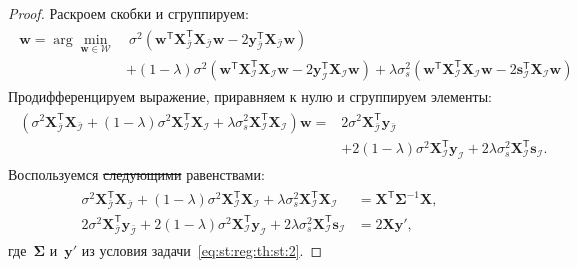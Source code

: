 \documentclass[12pt]{a&t}
\providecommand{\DIFdel}[1]{{\protect\color{red}\sout{#1}}}                      %
\providecommand{\DIFdelbegin}{} %
\providecommand{\DIFdelend}{} %
\newcommand{\DIFscaledelfig}{0.5}
\newlength{\DIFdelgraphicswidth} %
\newlength{\DIFdelgraphicsheight} %
\newcommand{\DIFdelincludegraphics}[2][]{%
\sbox{\DIFdelgraphicsbox}{\DIFOincludegraphics[#1]{#2}}%
\settoboxwidth{\DIFdelgraphicswidth}{\DIFdelgraphicsbox} %
\settoboxtotalheight{\DIFdelgraphicsheight}{\DIFdelgraphicsbox} %
\scalebox{\DIFscaledelfig}{%
\parbox[b]{\DIFdelgraphicswidth}{\usebox{\DIFdelgraphicsbox}\\[-\baselineskip] \rule{\DIFdelgraphicswidth}{0em}}\llap{\resizebox{\DIFdelgraphicswidth}{\DIFdelgraphicsheight}{%
\setlength{\unitlength}{\DIFdelgraphicswidth}%
\begin{picture}(1,1)%
\thicklines\linethickness{2pt} %
{\color[rgb]{1,0,0}\put(0,0){\framebox(1,1){}}}%
{\color[rgb]{1,0,0}\put(0,0){\line( 1,1){1}}}%
{\color[rgb]{1,0,0}\put(0,1){\line(1,-1){1}}}%
\end{picture}%
}\hspace*{3pt}}} %
} %
\DeclareRobustCommand{\DIFdelbegin}{\DIFOdelbegin \let\includegraphics\DIFdelincludegraphics} %
\DeclareRobustCommand{\DIFdelend}{\DIFOaddend \let\includegraphics\DIFOincludegraphics} %
\begin{document}
\begin{proof}
Раскроем скобки и сгруппируем:
\begin{gather}
\label{eq:st:reg:3}
\begin{aligned}
\hat{\mathbf{w}} = \arg\min_{\mathbf{w}\in \mathcal{W}} &~ \sigma^2\left(\mathbf{w}^{\mathsf{T}}\mathbf{X}^{\mathsf{T}}_{\bar{\mathcal{I}}}\mathbf{X}_{\bar{\mathcal{I}}}\mathbf{w} - 2\mathbf{y}^{\mathsf{T}}_{\bar{\mathcal{I}}}\mathbf{X}_{\bar{\mathcal{I}}}\mathbf{w}\right) \\
&+ \left(1-\lambda\right)\sigma^2\left(\mathbf{w}^{\mathsf{T}}\mathbf{X}^{\mathsf{T}}_{\mathcal{I}}\mathbf{X}_{\mathcal{I}}\mathbf{w}- 2\mathbf{y}^{\mathsf{T}}_{\mathcal{I}}\mathbf{X}_{\mathcal{I}}\mathbf{w}\right) + \lambda\sigma^2_s\left(\mathbf{w}^{\mathsf{T}}\mathbf{X}^{\mathsf{T}}_{\mathcal{I}}\mathbf{X}_{\mathcal{I}}\mathbf{w}- 2\mathbf{s}^{\mathsf{T}}_{\mathcal{I}}\mathbf{X}_{\mathcal{I}}\mathbf{w}\right)
\end{aligned}
\end{gather}
Продифференцируем выражение, приравняем к нулю и сгруппируем элементы:
\begin{gather}
\label{eq:st:reg:4}
\begin{aligned}
\left(\sigma^{2}\mathbf{X}^{\mathsf{T}}_{\bar{\mathcal{I}}}\mathbf{X}_{\bar{\mathcal{I}}} + \left(1-\lambda\right)\sigma^2\mathbf{X}^{\mathsf{T}}_{\mathcal{I}}\mathbf{X}_{\mathcal{I}} + \lambda\sigma^{2}_s\mathbf{X}^{\mathsf{T}}_{\mathcal{I}}\mathbf{X}_{\mathcal{I}}\right) \mathbf{w} =& 2\sigma^2\mathbf{X}^{\mathsf{T}}_{\bar{\mathcal{I}}}\mathbf{y}_{\bar{\mathcal{I}}} \\
&+ 2\left(1-\lambda\right)\sigma^2\mathbf{X}^{\mathsf{T}}_{\mathcal{I}}\mathbf{y}_{\mathcal{I}} + 2\lambda\sigma_s^2\mathbf{X}^{\mathsf{T}}_{\mathcal{I}}\mathbf{s}_{\mathcal{I}}.
\end{aligned}
\end{gather}
Воспользуемся \DIFdelbegin \DIFdel{следующими }\DIFdelend равенствами:
\begin{gather}
\label{eq:st:reg:simp}
\begin{aligned}
\sigma^{2}\mathbf{X}^{\mathsf{T}}_{\bar{\mathcal{I}}}\mathbf{X}_{\bar{\mathcal{I}}} + \left(1-\lambda\right)\sigma^2\mathbf{X}^{\mathsf{T}}_{\mathcal{I}}\mathbf{X}_{\mathcal{I}} + \lambda\sigma^{2}_s\mathbf{X}^{\mathsf{T}}_{\mathcal{I}}\mathbf{X}_{\mathcal{I}} &= \mathbf{X}^{\mathsf{T}}\bm{\Sigma}^{-1}\mathbf{X},\\
2\sigma^2\mathbf{X}^{\mathsf{T}}_{\bar{\mathcal{I}}}\mathbf{y}_{\bar{\mathcal{I}}} + 2\left(1-\lambda\right)\sigma^2\mathbf{X}^{\mathsf{T}}_{\mathcal{I}}\mathbf{y}_{\mathcal{I}} + 2\lambda\sigma_s^2\mathbf{X}^{\mathsf{T}}_{\mathcal{I}}\mathbf{s}_{\mathcal{I}} &= 2\mathbf{X}\mathbf{y'},
\end{aligned}
\end{gather}
где~$\bm{\Sigma}$ и~$\mathbf{y'}$ из условия задачи~\eqref{eq:st:reg:th:st:2}.


\end{proof}
\end{document}
